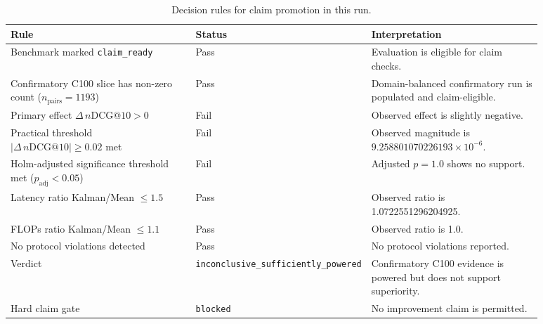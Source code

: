 \begin{table}[t]
\centering
\caption{Decision rules for claim promotion in this run.}
\label{tab:decision-rules}
\begin{tabular}{p{0.38\linewidth}p{0.16\linewidth}p{0.34\linewidth}}
\toprule
Rule & Status & Interpretation \\
\midrule
Benchmark marked \texttt{claim\_ready} & Pass & Evaluation is eligible for claim checks. \\
Confirmatory C100 slice has non-zero count ($n_{\text{pairs}}=1193$) & Pass & Domain-balanced confirmatory run is populated and claim-eligible. \\
Primary effect $\Delta\,n\mathrm{DCG}@10 > 0$ & Fail & Observed effect is slightly negative. \\
Practical threshold $|\Delta\,n\mathrm{DCG}@10|\ge 0.02$ met & Fail & Observed magnitude is $9.258801070226193\times10^{-6}$. \\
Holm-adjusted significance threshold met ($p_{\mathrm{adj}}<0.05$) & Fail & Adjusted $p=1.0$ shows no support. \\
Latency ratio Kalman/Mean $\le 1.5$ & Pass & Observed ratio is 1.0722551296204925. \\
FLOPs ratio Kalman/Mean $\le 1.1$ & Pass & Observed ratio is 1.0. \\
No protocol violations detected & Pass & No protocol violations reported. \\
\midrule
Verdict & \texttt{inconclusive\_sufficiently\_powered} & Confirmatory C100 evidence is powered but does not support superiority. \\ 
Hard claim gate & \texttt{blocked} & No improvement claim is permitted. \\
\bottomrule
\end{tabular}
\end{table}

